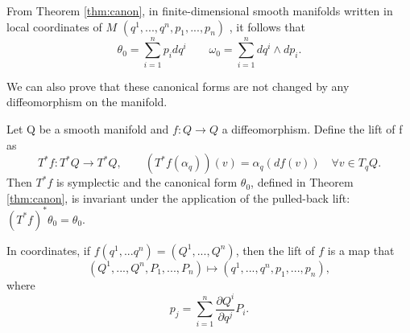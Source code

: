 \begin{corollary}\label{crl:canon-coord}
	From Theorem \ref{thm:canon}, in finite-dimensional smooth manifolds written in local coordinates of $M$ $(q^1,...,q^n,p_1,...,p_n)$ , it follows that
	\[
		\theta_0 = \sum_{i=1}^n p_i dq^i \qquad \omega_0 = \sum_{i=1}^n dq^i \wedge dp_i.
	\]
\end{corollary}

\noindent We can also prove that these canonical forms are not changed by any diffeomorphism on the manifold.
\begin{theorem}\label{thm:inv-canon}
	Let Q be a smooth manifold and $f: Q \to Q$ a diffeomorphism. Define the lift of f as
	\[
		T^*f : T^*Q \to T^*Q, \qquad (T^*f(\alpha_q))(v) = \alpha_q(df(v)) \quad \forall v \in T_qQ.
	\]
	Then $T^*f$ is symplectic and the canonical form $\theta_0$, defined in Theorem \ref{thm:canon}, is invariant under the application of the pulled-back lift:  $(T^*f)^*\theta_0 = \theta_0$.
\end{theorem}

\begin{remark}
	In coordinates, if $f(q^1,...q^n) = (Q^1,...,Q^n)$, then the lift of $f$ is a map that 
	\[
		(Q^1,...,Q^n, P_1,...,P_n) \mapsto (q^1,...,q^n, p_1,...,p_n),
	\] 
	where
	\[
		p_j = \sum_{i=1}^n \frac{\partial Q^i}{\partial q^j} P_i.
	\]
\end{remark}
